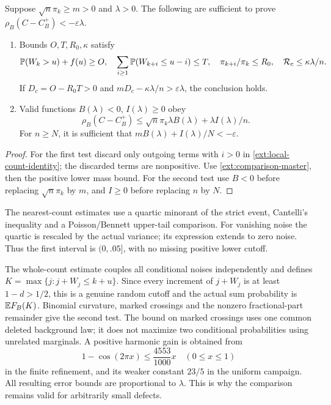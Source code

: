 \begin{lemma}\label{ext:two-local-tests}
Suppose $\sqrt n\pi_k\ge m>0$ and $\lambda>0$.
The following are sufficient to prove
$\rho_B(C-C_B^+)<-\varepsilon\lambda$.
\begin{enumerate}
\item Bounds $O,T,R_0,\kappa$ satisfy
\[
 \mathbb P(W_k>u)+f(u)\ge O,\quad
 \sum_{i\ge1}\mathbb P(W_{k+i}\le u-i)\le T,\quad
 \pi_{k+i}/\pi_k\le R_0,\quad
 \mathcal R_c\le\kappa\lambda/n.
\]
If $D_c=O-R_0T>0$ and $mD_c-\kappa\lambda/n>
\varepsilon\lambda$, the conclusion holds.
\item Valid functions $B(\lambda)<0$, $I(\lambda)\ge0$ obey
\[
 \rho_B(C-C_B^+)\le\sqrt n\pi_k\lambda B(\lambda)
                         +\lambda I(\lambda)/n.
\]
For $n\ge N$, it is sufficient that
$mB(\lambda)+I(\lambda)/N<-\varepsilon$.
\end{enumerate}
\end{lemma}
\begin{proof}
For the first test discard only outgoing terms with $i>0$ in
\eqref{ext:local-count-identity}; the discarded terms are nonpositive.
Use \eqref{ext:comparison-master}, then the positive lower mass bound.
For the second test use $B<0$ before replacing $\sqrt n\pi_k$ by $m$,
and $I\ge0$ before replacing $n$ by $N$.
\end{proof}

The nearest-count estimates use a quartic minorant of the strict event,
Cantelli's inequality and a Poisson/Bennett upper-tail comparison.
For vanishing noise the quartic is rescaled by the actual variance;
its expression extends to zero noise. Thus the first interval is
$(0,.05]$, with no missing positive lower cutoff.

The whole-count estimate couples all conditional noises independently
and defines $K=\max\{j:j+W_j\le k+u\}$. Since every increment of
$j+W_j$ is at least $1-d>1/2$, this is a genuine random cutoff and
the actual sum probability is $\mathbb E F_B(K)$. Binomial curvature,
marked crossings and the nonzero fractional-part remainder give the
second test. The bound on marked crossings uses one common deleted
background law; it does not maximize two conditional probabilities
using unrelated marginals. A positive harmonic gain is obtained from
\[
 1-\cos(2\pi x)\le\frac{4553}{1000}x\quad(0\le x\le1)
\]
in the finite refinement, and its weaker constant $23/5$ in the uniform
campaign. All resulting error bounds are proportional to $\lambda$.
This is why the comparison remains valid for arbitrarily small defects.

